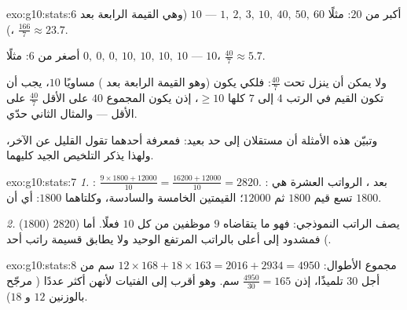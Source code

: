 \begin{solution}{exo:g10:stats:6}
 أكبر من $20$: مثلًا
$1,\ 2,\ 3,\ 10,\ 40,\ 50,\ 60$ ---  $10$ (وهي القيمة الرابعة بعد )،
 $\frac{166}{7} \approx 23.7$.

 أصغر من $6$: مثلًا
$0,\ 0,\ 0,\ 10,\ 10,\ 10,\ 10$ ---  $10$، 
$\frac{40}{7} \approx 5.7$.

ولا يمكن  أن ينزل تحت $\frac{40}{7}$: فلكي يكون  (وهو القيمة
الرابعة بعد ) مساويًا $10$، يجب أن تكون القيم في الرتب $4$ إلى $7$ كلها
$\geq 10$، إذن يكون المجموع $40$ على الأقل  $\frac{40}{7}$
على الأقل --- والمثال الثاني حدّي.

وتبيّن هذه الأمثلة أن   مستقلان إلى حد بعيد:
فمعرفة أحدهما تقول القليل عن الآخر، ولهذا يذكر التلخيص الجيد
كليهما.
\end{solution}

\begin{solution}{exo:g10:stats:7}
\emph{1.} :
$\frac{9 \times 1800 + 12000}{10} = \frac{16200 + 12000}{10} = 2820$.
: بعد ، الرواتب العشرة هي تسع قيم $1800$ ثم $12000$؛
  القيمتين الخامسة والسادسة، وكلتاهما $1800$:
أي أن  $1800$.

\emph{2.}  ($1800$) يصف الراتب النموذجي: فهو ما
يتقاضاه $9$ موظفين من كل $10$ فعلًا. أما  ($2820$) فمشدود إلى أعلى
بالراتب المرتفع الوحيد ولا يطابق قسيمة راتب أحد.
\end{solution}

\begin{solution}{exo:g10:stats:8}
مجموع الأطوال: $12 \times 168 + 18 \times 163 = 2016 + 2934 = 4950$ سم من أجل
$30$ تلميذًا، إذن  $\frac{4950}{30} = 165$ سم. وهو أقرب إلى
 الفتيات لأنهن أكثر عددًا ( مرجّح بالوزنين
$12$ و $18$).
\end{solution}

